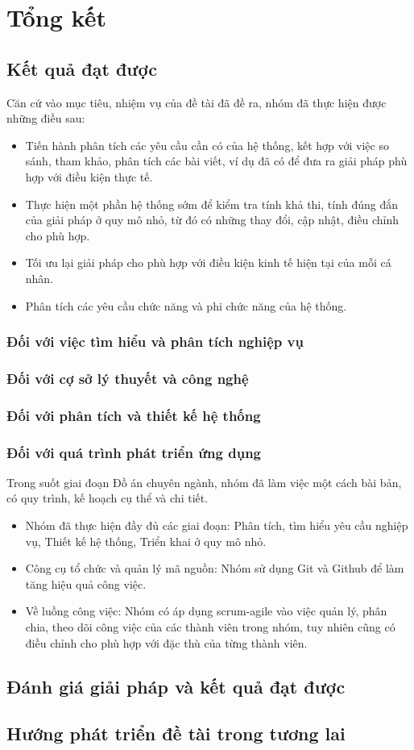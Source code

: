 \chapter{Tổng kết}
\section{Kết quả đạt được}
\noindent Căn cứ vào mục tiêu, nhiệm vụ của đề tài đã đề ra, nhóm đã thực hiện được những điều sau:
\begin{itemize}
    \item Tiến hành phân tích các yêu cầu cần có của hệ thống, kết hợp với việc so sánh, tham khảo, phân tích các bài viết, ví dụ đã có để đưa ra giải pháp phù hợp với điều kiện thực tế.
    \item Thực hiện một phần hệ thống sớm để kiểm tra tính khả thi, tính đúng đắn của giải pháp ở quy mô nhỏ, từ đó có những thay đổi, cập nhật, điều chỉnh cho phù hợp.
    \item Tối ưu lại giải pháp cho phù hợp với điều kiện kinh tế hiện tại của mỗi cá nhân.
    \item Phân tích các yêu cầu chức năng và phi chức năng của hệ thống.
\end{itemize}
\subsection{Đối với việc tìm hiểu và phân tích nghiệp vụ}
\subsection{Đối với cợ sở lý thuyết và công nghệ}
\subsection{Đối với phân tích và thiết kế hệ thống}
\subsection{Đối với quá trình phát triển ứng dụng}
\noindent Trong suốt giai đoạn Đồ án chuyên ngành, nhóm đã làm việc một cách bài bản, có quy trình, kế hoạch cụ thể và chi tiết.
\begin{itemize}
    \item Nhóm đã thực hiện đầy đủ các giai đoạn: Phân tích, tìm hiểu yêu cầu nghiệp vụ, Thiết kế hệ thống, Triển khai ở quy mô nhỏ.
    \item Công cụ tổ chức và quản lý mã nguồn: Nhóm sử dụng Git và Github để làm tăng hiệu quả công việc.
    \item Về luồng công việc: Nhóm có áp dụng scrum-agile vào việc quản lý, phân chia, theo dõi công việc của các thành viên trong nhóm, tuy nhiên cũng có điều chỉnh cho phù hợp với đặc thù của từng thành viên.
\end{itemize}
\section{Đánh giá giải pháp và kết quả đạt được}
\section{Hướng phát triển đề tài trong tương lai}